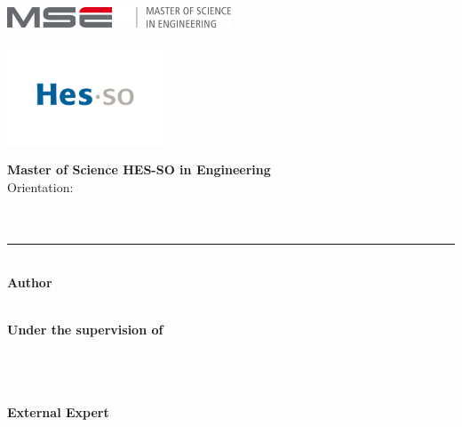 
\begin{titlepage}
\begin{center}

    \begin{minipage}{0.5\textwidth}
        \raggedright
        \includegraphics[height=0.6cm]{img/mse_logo}  %
    \end{minipage}%
    \begin{minipage}{0.5\textwidth}
        \raggedleft
        \includegraphics[height=3cm]{img/HES_SO_Logo_RGB}  %
    \end{minipage}

    \vspace{1cm}

    {\large \textbf{Master of Science HES-SO in Engineering}}\\
    {\large Orientation: \Orientation}\\[2cm]

    {\Huge \textbf{\ThesisTitle}}\\[0.3cm]
    {\LARGE \textit{\ThesisSubject}}\\[1cm]

    \rule{\textwidth}{0.4mm} \\[0.5cm]
    {\LARGE \textbf{Author}}\\
    {\Large \Author} \\[2cm]

    \begin{minipage}{0.48\textwidth}
        \centering
        {\large \textbf{Under the supervision of}}\\
        {\large \Advisor}\\
        {\large \SAdvisor}\\
        {\small \AdvisorResearchUnit}\\
    \end{minipage}
    \hfill
    \begin{minipage}{0.48\textwidth}
        \centering
        {\large \textbf{External Expert}}\\
        {\large \Expert}\\
    \end{minipage}
    \\[1.5cm]


\end{center}
\end{titlepage}
